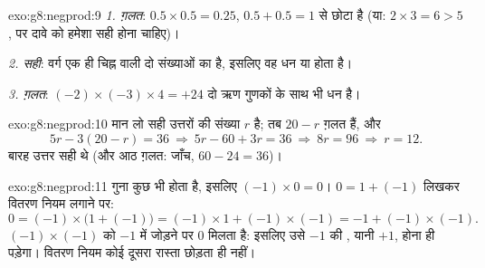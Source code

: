 \begin{solution}{exo:g8:negprod:9}
\emph{1. ग़लत}: $0.5 \times 0.5 = 0.25$, $0.5 + 0.5 = 1$ से छोटा है
(या: $2 \times 3 = 6 > 5$, पर दावे को हमेशा सही होना चाहिए)।

\emph{2. सही}: वर्ग एक ही चिह्न वाली दो संख्याओं का  है,
इसलिए वह धन या  होता है।

\emph{3. ग़लत}: $(-2) \times (-3) \times 4 = +24$ दो ऋण गुणकों के
साथ भी धन है।
\end{solution}

\begin{solution}{exo:g8:negprod:10}
मान लो सही उत्तरों की संख्या $r$ है; तब $20 - r$ ग़लत हैं, और
\[
5r - 3(20 - r) = 36
\ \Longrightarrow\
5r - 60 + 3r = 36
\ \Longrightarrow\
8r = 96
\ \Longrightarrow\
r = 12 .
\]
बारह उत्तर सही थे (और आठ ग़लत: जाँच,
$60 - 24 = 36$)।
\end{solution}

\begin{solution}{exo:g8:negprod:11}
 गुना कुछ भी  होता है, इसलिए $(-1) \times 0 = 0$।
$0 = 1 + (-1)$ लिखकर वितरण नियम लगाने पर:
\[
0 = (-1) \times \bigl(1 + (-1)\bigr)
= (-1) \times 1 + (-1) \times (-1)
= -1 + (-1) \times (-1).
\]
$(-1) \times (-1)$ को $-1$ में जोड़ने पर $0$ मिलता है: इसलिए उसे
$-1$ की , यानी $+1$, होना ही पड़ेगा। वितरण नियम कोई
दूसरा रास्ता छोड़ता ही नहीं।
\end{solution}

